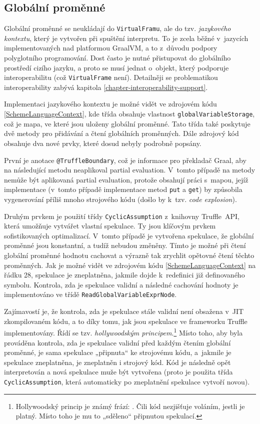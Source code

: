 \documentclass[
  master,
  biblatex,
  figures=true,
  theorems,
  sourcecodes,
  glossaries,
  index
]{kidiplom}
\begin{document}
\clearpage


\subsection{Globální proměnné}
Globální proměnné se neukládají do \texttt{VirtualFramu}, ale do tzv. \textit{jazykového kontextu}, který je vytvořen při spuštění interpretu. To je zcela běžné v~jazycích implementovaných nad platformou GraalVM, a to z~důvodu podpory polyglotního programování. Dost často je nutné přistupovat do globálního prostředí cizího jazyku, a proto se musí jednat o~objekt, který podporuje interoperabilitu (což \texttt{VirtualFrame} není). Detailněji se problematikou interoperability zabývá kapitola \ref{chapter-interoperability-support}. 

Implementaci jazykového kontextu je možné vidět ve zdrojovém kódu \ref{SchemeLanguageContext}, kde třída obsahuje vlastnost \texttt{globalVariableStorage}, což je mapa, ve které jsou uloženy globální proměnné. Tato třída také poskytuje dvě metody pro přidávání a čtení globálních proměnných. Dále zdrojový kód obsahuje dva nové prvky, které dosud nebyly podrobně popsány.



První je anotace \texttt{@TruffleBoundary}, což je informace pro překladač Graal, aby na následující metodu neaplikoval partial evaluation. V~tomto případě na metody nemůže být aplikovaná partial evaluation, protože obsahují práci s~mapou, jejíž implementace (v~tomto případě implementace metod \texttt{put} a \texttt{get}) by způsobila vygenerování příliš mnoho strojového kódu (došlo by k~tzv. \textit{code explosion}).

Druhým prvkem je použití třídy \texttt{CyclicAssumption} z~knihovny Truffle~API, která umožňuje vytvářet vlastní spekulace. Ty jsou klíčovým prvkem sofistikovaných optimalizací. V~tomto případě je vytvořena spekulace, že globální proměnné jsou konstantní, a tudíž nebudou změněny. Tímto je možné při čtení globální proměnné hodnotu cachovat a výrazně tak zrychlit opětovné čtení těchto proměnných. Jak je možné vidět ve zdrojovém kódu \ref{SchemeLanguageContext} na řádku 28, spekulace je zneplatněna, jakmile dojde k~redefinici již definovaného symbolu. Kontrola, zda je spekulace validní a následné cachování hodnoty je implementováno ve třídě \texttt{ReadGlobalVariableExprNode}. 

Zajímavostí je, že kontrola, zda je spekulace stále validní není obsažena v~JIT zkompilovaném kódu, a to díky tomu, jak jsou spekulace ve frameworku Truffle implementovány. Řídí se tzv. \textit{hollywoodským principem}.\footnote{Hollywoodský princip je známý frází: . Čili kód nezjišťuje voláním, jestli je platný. Místo toho je mu to „sděleno“ připnutou spekulací.} Místo toho, aby byla prováděna kontrola, zda je spekulace validní před každým čtením globální proměnné, je sama spekulace „připnuta“ ke strojovému kódu, a~jakmile je spekulace zneplatněna, je zneplatněn i strojový kód. Kód je následně opět interpretován a nová spekulace muže být vytvořena (proto je použita třída \texttt{CyclicAssumption}, která automaticky po zneplatnění spekulace vytvoří novou).
\end{document}
